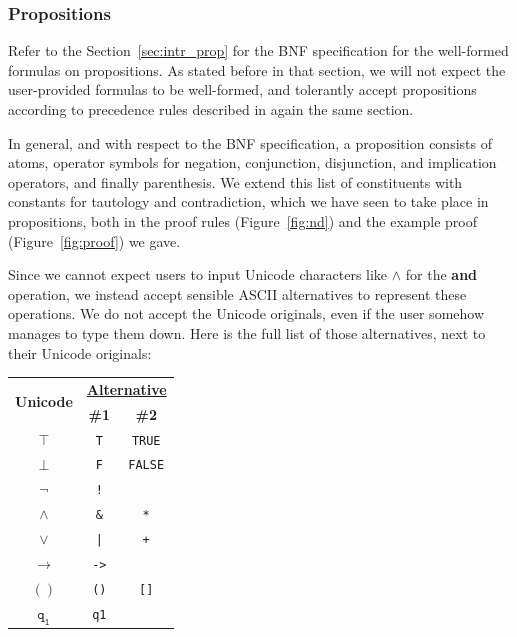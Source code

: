 \documentclass[12pt]{article}
\newcommand{\imp}{\ensuremath{\rightarrow}}
\begin{document}
\subsubsection{Propositions}

Refer to the Section~\ref{sec:intr_prop} for the BNF specification
for the well-formed formulas on propositions. As stated before
in that section, we will not expect the user-provided formulas
to be well-formed, and tolerantly accept propositions according
to precedence rules described in again the same section.

In general, and with respect to the BNF specification, a proposition
consists of atoms, operator symbols for negation, conjunction,
disjunction, and implication operators, and finally parenthesis.
We extend this list of constituents with constants for tautology and
contradiction, which we have seen to take place in propositions, both
in the proof rules (Figure~\ref{fig:nd}) and the example proof
(Figure~\ref{fig:proof}) we gave.

Since we cannot expect users to input Unicode characters like $\land$
for the \textbf{and} operation, we instead accept sensible ASCII
alternatives to represent these operations. We do not accept the
Unicode originals, even if the user somehow manages to type them down.
Here is the full list of those alternatives, next to their Unicode
originals:

\begin{center}
	\begin{tabular}{c | c c}
		\multirow{2}{*}{\textbf{Unicode}} & \multicolumn{2}{c}{\textbf{\underline{Alternative}}}\\
		& \textbf{\#1} & \textbf{\#2}\\
		\hline
		$\mathtt{\top}$  & \verb|T|                & \verb|TRUE|\\
		$\mathtt{\bot}$  & \verb|F|                & \verb|FALSE|\\
		$\mathtt{\neg}$  & \verb|!|                & \\
		$\mathtt{\land}$ & \verb|&|                & \verb|*|\\
		$\mathtt{\lor}$  & \verb^|^                & \verb|+|\\
		$\mathtt{\imp}$  & \verb|->|               & \\
		$\mathtt{()}$    & \verb|()|               & \verb|[]|\\
		$\mathtt{q_1}$   & \verb|q1|               &
	\end{tabular}
\end{center}
\end{document}
